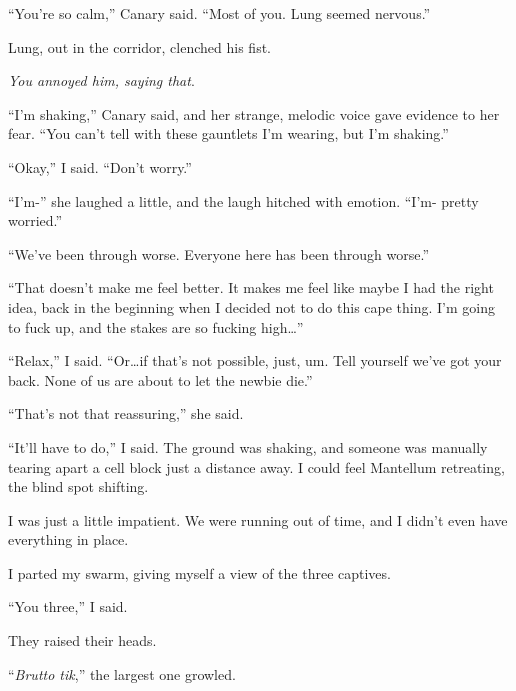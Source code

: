 ``You're so calm,'' Canary said.  ``Most of you.  Lung seemed nervous.''



Lung, out in the corridor, clenched his fist.



\emph{You annoyed him, saying that}.



``I'm shaking,'' Canary said, and her strange, melodic voice gave evidence to her fear.  ``You can't tell with these gauntlets I'm wearing, but I'm shaking.''



``Okay,'' I said.  ``Don't worry.''



``I'm-'' she laughed a little, and the laugh hitched with emotion.  ``I'm- pretty worried.''



``We've been through worse.  Everyone here has been through worse.''



``That doesn't make me feel better.  It makes me feel like maybe I had the right idea, back in the beginning when I decided not to do this cape thing.  I'm going to fuck up, and the stakes are so fucking high\ldots''



``Relax,'' I said.  ``Or\ldots if that's not possible, just, um.  Tell yourself we've got your back.  None of us are about to let the newbie die.''



``That's not that reassuring,'' she said.



``It'll have to do,'' I said.  The ground was shaking, and someone was manually tearing apart a cell block just a distance away.  I could feel Mantellum retreating, the blind spot shifting.



I was just a little impatient.  We were running out of time, and I didn't even have everything in place.



I parted my swarm, giving myself a view of the three captives.



``You three,'' I said.



They raised their heads.



``\emph{Brutto tik},'' the largest one growled.



